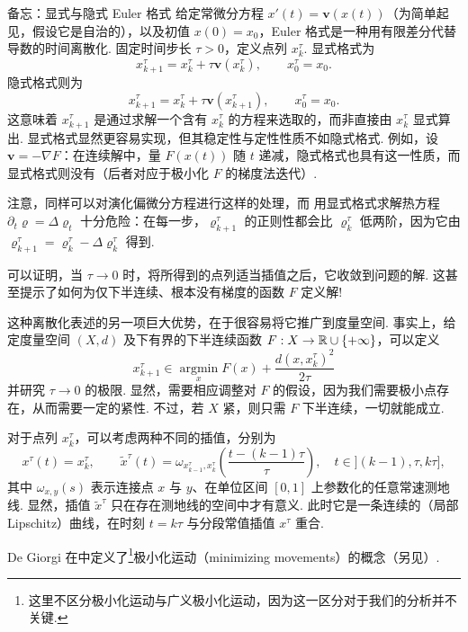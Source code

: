 \begin{sourcebox}{备忘：显式与隐式 Euler 格式}\label{box:8.1}
给定常微分方程 $x'(t)=\mathbf v(x(t))$（为简单起见，假设它是自治的），以及初值 $x(0)=x_0$，Euler 格式是一种用有限差分代替导数的时间离散化. 固定时间步长 $\tau>0$，定义点列 $x_k^\tau$. 显式格式为
\[
x_{k+1}^\tau=x_k^\tau+\tau\mathbf v(x_k^\tau),\qquad x_0^\tau=x_0.
\]
隐式格式则为
\[
x_{k+1}^\tau=x_k^\tau+\tau\mathbf v(x_{k+1}^\tau),\qquad x_0^\tau=x_0.
\]
这意味着 $x_{k+1}^\tau$ 是通过求解一个含有 $x_k^\tau$ 的方程来选取的，而非直接由 $x_k^\tau$ 显式算出. 显式格式显然更容易实现，但其稳定性与定性性质不如隐式格式. 例如，设 $\mathbf v=-\nabla F$：在连续解中，量 $F(x(t))$ 随 $t$ 递减，隐式格式也具有这一性质，而显式格式则没有（后者对应于极小化 $F$ 的梯度法迭代）.

注意，同样可以对演化偏微分方程进行这样的处理，而\label{idx:i75-p287}
用显式格式求解热方程 $\partial_t\varrho=\Delta\varrho_t$ 十分危险：在每一步，$\varrho_{k+1}^\tau$ 的正则性都会比 $\varrho_k^\tau$ 低两阶，因为它由 $\varrho_{k+1}^\tau=\varrho_k^\tau-\Delta\varrho_k^\tau$ 得到.
\end{sourcebox}

可以证明，当 $\tau\to0$ 时，将所得到的点列适当插值之后，它收敛到问题的解. 这甚至提示了如何为仅下半连续、根本没有梯度的函数 $F$ 定义解!

这种离散化表述的另一项巨大优势，在于很容易将它推广到度量空间. 事实上，给定度量空间 $(X,d)$ 及下有界的下半连续函数 $F:X\to\mathbb R\cup\{+\infty\}$，可以定义
\begin{equation}\label{eq:8.1}
x_{k+1}^\tau\in\operatorname*{argmin}_x F(x)+\frac{d(x,x_k^\tau)^2}{2\tau}
\end{equation}
并研究 $\tau\to0$ 的极限. 显然，需要相应调整对 $F$ 的假设，因为我们需要极小点存在，从而需要一定的紧性. 不过，若 $X$ 紧，则只需 $F$ 下半连续，一切就能成立.

对于点列 $x_k^\tau$，可以考虑两种不同的插值，分别为
\[
x^\tau(t)=x_k^\tau,\qquad
\widetilde x^\tau(t)=\omega_{x_{k-1}^\tau,x_k^\tau}\left(\frac{t-(k-1)\tau}{\tau}\right),
\quad t\in ](k-1),\tau,k\tau],
\]
其中 $\omega_{x,y}(s)$ 表示连接点 $x$ 与 $y$、在单位区间 $[0,1]$ 上参数化的任意常速测地线. 显然，插值 $\widetilde x^\tau$ 只在存在测地线的空间中才有意义. 此时它是一条连续的（局部 Lipschitz）曲线，在时刻 $t=k\tau$ 与分段常值插值 $x^\tau$ 重合.

De Giorgi 在\cite{b137}中定义了\footnote{这里不区分极小化运动与广义极小化运动，因为这一区分对于我们的分析并不关键.}极小化运动（minimizing movements）的概念（另见\cite{b7}）.

